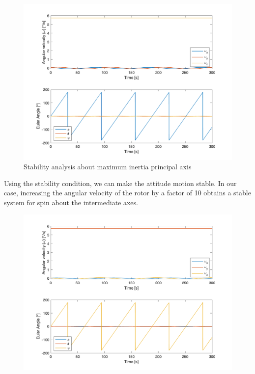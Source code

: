 \begin{figure}[H]
\centering
\includegraphics[scale=0.6]{Images/ps4_problem3c_z.png}
\caption{Stability analysis about maximum inertia principal axis}
\label{fig:ps4_problem3c_z.png}
\end{figure}

Using the stability condition, we can make the attitude motion stable. In our case, increasing the angular velocity of the rotor by a factor of 10 obtains a stable system for spin about the intermediate axes.

\begin{figure}[H]
\centering
\includegraphics[scale=0.6]{Images/ps4_problem3d.png}
\caption{}
\label{fig:ps4_problem3d.png}
\end{figure}

